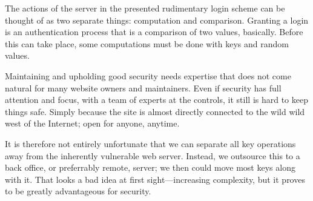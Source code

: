 The actions of the server in the presented rudimentary login scheme can be thought of as two separate things: computation and comparison.
Granting a login is an authentication process that is a comparison of two values, basically.
Before this can take place, some computations must be done with keys and random values.
\par
Maintaining and upholding good security needs expertise that does not come natural for many website owners and maintainers.
Even if security has full attention and focus, with a team of experts at the controls, it still is hard to keep things safe.
Simply because the site is almost directly connected to the wild wild west of the Internet; open for anyone, anytime.
\par
It is therefore not entirely unfortunate that we can separate all key operations away from the inherently vulnerable web server.
Instead, we outsource this to a back office, or preferrably remote, server; we then could move most keys along with it.
That looks a bad idea at first sight---increasing complexity, but it proves to be greatly advantageous for security.

